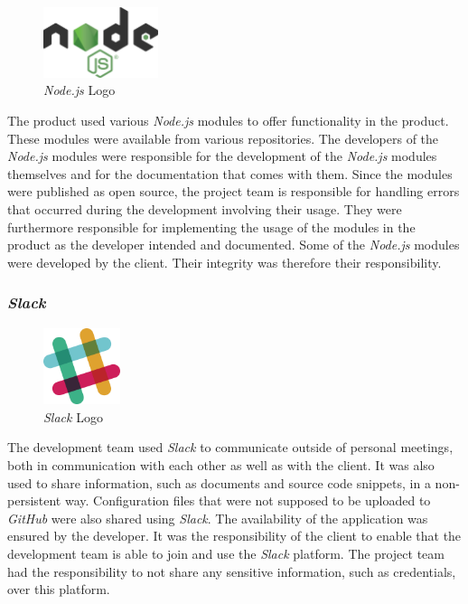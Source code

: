 \begin{figure}[H]
    \begin{center}
        \includegraphics[width=0.3\textwidth]{images/logos/node-js-logo.png}
        \caption{\textit{Node.js} Logo}
        \label{fig:node-js-logo}
    \end{center}
\end{figure}

The product used various \textit{Node.js} modules to offer functionality in the product. These modules were available from various repositories.
\newline
The developers of the \textit{Node.js} modules were responsible for the development of the \textit{Node.js} modules themselves and for the documentation that comes with them. Since the modules were published as open source, the project team is responsible for handling errors that occurred during the development involving their usage. They were furthermore responsible for implementing the usage of the modules in the product as the developer intended and documented.
\newline
Some of the \textit{Node.js} modules were developed by the client. Their integrity was therefore their responsibility.

\subsubsection{\textit{Slack}}
\label{sssec:slack}

\begin{figure}[H]
    \begin{center}
        \includegraphics[width=0.2\textwidth]{images/logos/slack-logo.png}
        \caption{\textit{Slack} Logo}
        \label{fig:slack-logo}
    \end{center}
\end{figure}

The development team used \textit{Slack} to communicate outside of personal meetings, both in communication with each other as well as with the client. It was also used to share information, such as documents and source code snippets, in a non-persistent way. Configuration files that were not supposed to be uploaded to \textit{GitHub} were also shared using \textit{Slack}.
\newline
The availability of the application was ensured by the developer. It was the responsibility of the client to enable that the development team is able to join and use the \textit{Slack} platform. The project team had the responsibility to not share any sensitive information, such as credentials, over this platform.